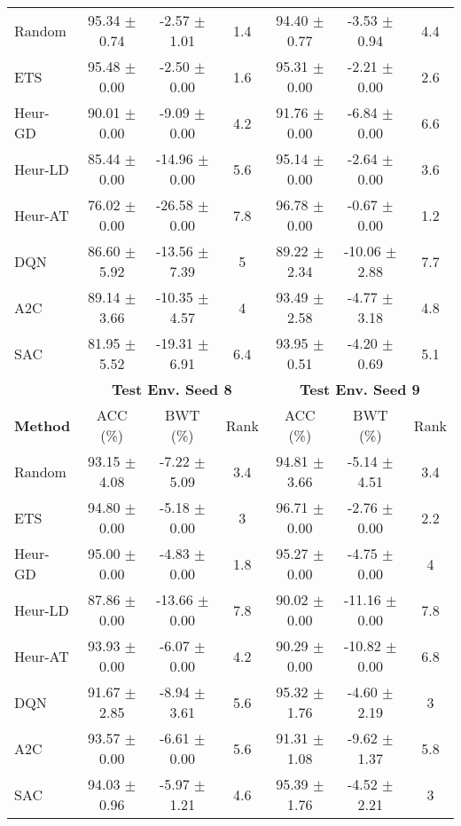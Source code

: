 \begin{tabular}{lcccccc}
	\midrule 
	Random          & 95.34 $\pm$ 0.74   & -2.57 $\pm$ 1.01    & 1.4    & 94.40 $\pm$ 0.77   & -3.53 $\pm$ 0.94    & 4.4    \\
	ETS             & 95.48 $\pm$ 0.00   & -2.50 $\pm$ 0.00    & 1.6    & 95.31 $\pm$ 0.00   & -2.21 $\pm$ 0.00    & 2.6    \\
	Heur-GD         & 90.01 $\pm$ 0.00   & -9.09 $\pm$ 0.00    & 4.2    & 91.76 $\pm$ 0.00   & -6.84 $\pm$ 0.00    & 6.6    \\
	Heur-LD         & 85.44 $\pm$ 0.00   & -14.96 $\pm$ 0.00   & 5.6    & 95.14 $\pm$ 0.00   & -2.64 $\pm$ 0.00    & 3.6    \\
	Heur-AT         & 76.02 $\pm$ 0.00   & -26.58 $\pm$ 0.00   & 7.8    & 96.78 $\pm$ 0.00   & -0.67 $\pm$ 0.00    & 1.2    \\
	DQN             & 86.60 $\pm$ 5.92   & -13.56 $\pm$ 7.39   & 5      & 89.22 $\pm$ 2.34   & -10.06 $\pm$ 2.88   & 7.7    \\
	A2C             & 89.14 $\pm$ 3.66   & -10.35 $\pm$ 4.57   & 4      & 93.49 $\pm$ 2.58   & -4.77 $\pm$ 3.18    & 4.8    \\
	SAC             & 81.95 $\pm$ 5.52   & -19.31 $\pm$ 6.91   & 6.4    & 93.95 $\pm$ 0.51   & -4.20 $\pm$ 0.69    & 5.1    \\
	\midrule 
	& \multicolumn{3}{c}{\textbf{Test Env. Seed 8}} & \multicolumn{3}{c}{\textbf{Test Env. Seed 9}} \\
	\cmidrule(lr){2-4} \cmidrule(lr){5-7}
	\textbf{Method} & ACC (\%)         & BWT (\%)          & Rank   & ACC (\%)         & BWT (\%)          & Rank   \\
	\midrule 
	Random          & 93.15 $\pm$ 4.08   & -7.22 $\pm$ 5.09    & 3.4    & 94.81 $\pm$ 3.66   & -5.14 $\pm$ 4.51    & 3.4    \\
	ETS             & 94.80 $\pm$ 0.00   & -5.18 $\pm$ 0.00    & 3      & 96.71 $\pm$ 0.00   & -2.76 $\pm$ 0.00    & 2.2    \\
	Heur-GD         & 95.00 $\pm$ 0.00   & -4.83 $\pm$ 0.00    & 1.8    & 95.27 $\pm$ 0.00   & -4.75 $\pm$ 0.00    & 4      \\
	Heur-LD         & 87.86 $\pm$ 0.00   & -13.66 $\pm$ 0.00   & 7.8    & 90.02 $\pm$ 0.00   & -11.16 $\pm$ 0.00   & 7.8    \\
	Heur-AT         & 93.93 $\pm$ 0.00   & -6.07 $\pm$ 0.00    & 4.2    & 90.29 $\pm$ 0.00   & -10.82 $\pm$ 0.00   & 6.8    \\
	DQN             & 91.67 $\pm$ 2.85   & -8.94 $\pm$ 3.61    & 5.6    & 95.32 $\pm$ 1.76   & -4.60 $\pm$ 2.19    & 3      \\
	A2C             & 93.57 $\pm$ 0.00   & -6.61 $\pm$ 0.00    & 5.6    & 91.31 $\pm$ 1.08   & -9.62 $\pm$ 1.37    & 5.8    \\
	SAC             & 94.03 $\pm$ 0.96   & -5.97 $\pm$ 1.21    & 4.6    & 95.39 $\pm$ 1.76   & -4.52 $\pm$ 2.21    & 3     \\
	\bottomrule
\end{tabular}